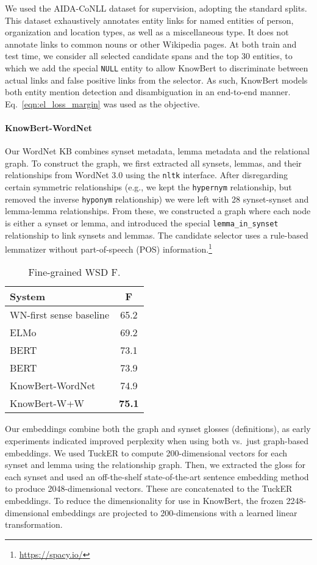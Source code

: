 \documentclass[11pt,a4paper]{article}
\newcommand{\KB}[0]{KnowBert}
\newcommand{\KBS}[0]{KnowBert }
\newcommand{\KWORDNET}[0]{KnowBert-WordNet}
\newcommand{\KWANDW}[0]{KnowBert-W+W}
\newcommand{\BBS}[0]{BERT }
\newcommand{\BLS}[0]{BERT }
\begin{document}
We used the AIDA-CoNLL dataset \cite{Hoffart2011RobustDO} for supervision, adopting the standard splits.  This dataset exhaustively annotates entity links for named entities of person, organization and location types, as well as a miscellaneous type.
It does not annotate links to common nouns or other Wikipedia pages.
At both train and test time, we consider all selected candidate spans and the top 30 entities, to which we add the special \texttt{NULL} entity to allow \KBS to discriminate between actual links and false positive links from the selector.
As such, \KBS models both entity mention detection and disambiguation in an end-to-end manner.  Eq.~\ref{eqn:el_loss_margin} was used as the objective.



\paragraph{\KWORDNET} Our WordNet KB combines synset metadata, lemma metadata and the relational graph.
To construct the graph, we first extracted all synsets, lemmas, and their relationships from WordNet 3.0 using the \texttt{nltk} interface.
After disregarding certain symmetric relationships (e.g., we kept the \texttt{hypernym} relationship, but removed the inverse \texttt{hyponym} relationship) we were left with 28 synset-synset and lemma-lemma relationships.
From these, we constructed a graph where each node is either a synset or lemma, and introduced the special \texttt{lemma\_in\_synset} relationship to link synsets and lemmas.
The candidate selector uses a rule-based lemmatizer without part-of-speech (POS) information.\footnote{\url{https://spacy.io/}}


\begin{table}
\centering
\begin{tabular}[t]{l c}
\toprule
System & F \\
 \midrule
 WN-first sense baseline & 65.2 \\
 ELMo & 69.2 \\
 \BBS & 73.1 \\
 \BLS & 73.9 \\
\KWORDNET & 74.9 \\
\KWANDW & \textbf{75.1} \\
\bottomrule
\end{tabular}
\caption{Fine-grained WSD F.
}
\label{tab:wsd}
\end{table}



Our embeddings combine both the graph and synset glosses (definitions), as early experiments indicated improved perplexity when using both vs.\ just graph-based embeddings.
We used TuckER \cite{Balazevic2019TuckERTF} to compute 200-dimensional vectors for each synset and lemma using the relationship graph.
Then, we extracted the gloss for each synset and used an off-the-shelf state-of-the-art sentence embedding method \cite{Subramanian2018} to produce 2048-dimensional vectors.
These are concatenated to the TuckER embeddings.
To reduce the dimensionality for use in \KB, the frozen 2248-dimensional embeddings are projected to 200-dimensions with a learned linear transformation.
\end{document}
